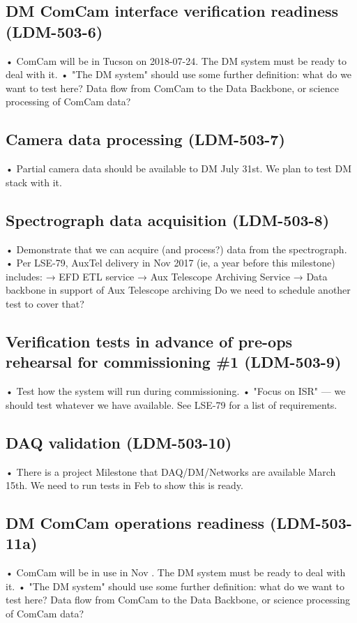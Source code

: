 \subsection{ DM ComCam interface verification readiness \textbf{(LDM-503-6)}\label{LDM-503-6}}
• ComCam will be in Tucson on 2018-07-24. The DM system must be ready to deal with it.
 \newline• "The DM system" should use some further definition: what do we want to test here? Data flow from ComCam to the Data Backbone, or science processing of ComCam data?
\subsection{ Camera data processing \textbf{(LDM-503-7)}\label{LDM-503-7}}
• Partial camera data should be available to DM July 31st. We plan to test DM stack with it.
 \newline
\subsection{ Spectrograph data acquisition \textbf{(LDM-503-8)}\label{LDM-503-8}}
• Demonstrate that we can acquire (and process?) data from the spectrograph.
 \newline• Per LSE-79, AuxTel delivery in Nov 2017 (ie, a year before this milestone) includes: → EFD ETL service → Aux Telescope Archiving Service → Data backbone in support of Aux Telescope archiving Do we need to schedule another test to cover that?
\subsection{Verification tests in advance of pre-ops rehearsal for commissioning \#1 \textbf{(LDM-503-9)}\label{LDM-503-9}}
• Test how the system will run during commissioning.
 \newline• "Focus on ISR" — we should test whatever we have available. See LSE-79 for a list of requirements.
\subsection{ DAQ validation \textbf{(LDM-503-10)}\label{LDM-503-10}}
• There is a project Milestone that DAQ/DM/Networks are available March 15th. We need to run tests in Feb to show this is ready.
 \newline
\subsection{ DM ComCam operations readiness \textbf{(LDM-503-11a)}\label{LDM-503-11a}}
• ComCam will be in use in Nov . The DM system must be ready to deal with it.
 \newline• "The DM system" should use some further definition: what do we want to test here? Data flow from ComCam to the Data Backbone, or science processing of ComCam data?
